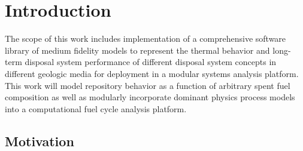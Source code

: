 \chapter{Introduction}
The scope of this work includes implementation of a comprehensive software library of
medium fidelity models to represent the thermal behavior and long-term disposal system
performance of different disposal system concepts in different geologic media for deployment in a 
modular systems analysis platform. This work will model repository behavior as a function of 
arbitrary spent fuel composition as well as modularly incorporate dominant physics process models 
into a computational fuel cycle analysis platform.

\section{Motivation}


